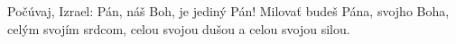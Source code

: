 Počúvaj, Izrael: Pán, náš Boh, je jediný Pán! Milovať budeš Pána, svojho Boha, celým svojím srdcom, celou svojou dušou a celou svojou silou. 
